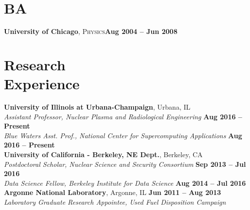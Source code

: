 \documentclass[margin,line]{resume}
\begin{document}
\begin{resume}
    \section{\mysidestyle BA}
    \textbf{University of Chicago}, \textsc{Physics}\hfill\textbf{Aug 2004 -- 
        Jun 2008}\vspace{-3mm}\\\vspace{-4mm}%
    \section{\mysidestyle Research\\Experience}
    \textbf{University of Illinois at Urbana-Champaign}, Urbana, IL\\
		\textsl{Assistant Professor, Nuclear Plasma and Radiological Engineering} \hfill \textbf{Aug 2016 -- Present}\\
		\textsl{Blue Waters Asst. Prof., National Center for 
                Supercomputing Applications} \hfill \textbf{Aug 2016 -- 
                Present}\vspace{2mm}\\
    \textbf{University of California - Berkeley, NE Dept.}, Berkeley, CA \\
		\textsl{Postdoctoral Scholar, Nuclear Science and Security Consortium} \hfill \textbf{Sep 2013 -- Jul 2016}\\
		\textsl{Data Science Fellow, Berkeley Institute for Data 
                Science} \hfill \textbf{Aug 2014 -- Jul 2016}\vspace{2mm}\\
    \textbf{Argonne National Laboratory}, Argonne, IL \hfill \textbf{Jun 2011 -- Aug 2013}\\
		\textsl{Laboratory Graduate Research Appointee, Used Fuel 
                Disposition Campaign}\vspace{2mm}\\

\end{resume}
\end{document}
